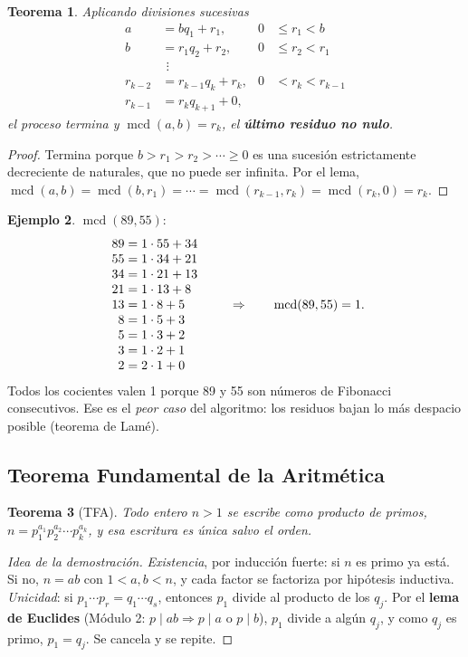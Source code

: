 \documentclass[11pt,a4paper]{article}
\newtheorem{teorema}{Teorema}[section]
\theoremstyle{definition}
\newtheorem{ejemplo}[teorema]{Ejemplo}
\newcommand{\mcd}{\operatorname{mcd}}
\theoremstyle{notait}
\theoremstyle{nota}
\begin{document}
\begin{teorema}
Aplicando divisiones sucesivas
\[
\begin{aligned}
a&=bq_1+r_1, & 0&\le r_1<b\\
b&=r_1q_2+r_2, & 0&\le r_2<r_1\\
&\ \,\vdots\\
r_{k-2}&=r_{k-1}q_k+r_k, & 0&<r_k<r_{k-1}\\
r_{k-1}&=r_kq_{k+1}+0,
\end{aligned}
\]
el proceso termina y $\mcd(a,b)=r_k$, el \textbf{último residuo no nulo}.
\end{teorema}

\begin{proof}
Termina porque $b>r_1>r_2>\cdots\ge 0$ es una sucesión estrictamente decreciente de naturales, que no puede ser infinita. Por el lema, $\mcd(a,b)=\mcd(b,r_1)=\cdots=\mcd(r_{k-1},r_k)=\mcd(r_k,0)=r_k$.
\end{proof}

\begin{ejemplo}
$\mcd(89,55)$:
\[
\begin{array}{r@{\;=\;}l}
89 & 1\cdot 55+34\\
55 & 1\cdot 34+21\\
34 & 1\cdot 21+13\\
21 & 1\cdot 13+8\\
13 & 1\cdot 8+5\\
8 & 1\cdot 5+3\\
5 & 1\cdot 3+2\\
3 & 1\cdot 2+1\\
2 & 2\cdot 1+0
\end{array}
\qquad\Rightarrow\qquad \mcd(89,55)=1.
\]
Todos los cocientes valen 1 porque 89 y 55 son números de Fibonacci consecutivos. Ese es el \emph{peor caso} del algoritmo: los residuos bajan lo más despacio posible (teorema de Lamé).
\end{ejemplo}

\subsection{Teorema Fundamental de la Aritmética}

\begin{teorema}[TFA]
Todo entero $n>1$ se escribe como producto de primos, $n=p_1^{a_1}p_2^{a_2}\cdots p_k^{a_k}$, y esa escritura es única salvo el orden.
\end{teorema}

\begin{proof}[Idea de la demostración]
\emph{Existencia}, por inducción fuerte: si $n$ es primo ya está. Si no, $n=ab$ con $1<a,b<n$, y cada factor se factoriza por hipótesis inductiva. \emph{Unicidad}: si $p_1\cdots p_r=q_1\cdots q_s$, entonces $p_1$ divide al producto de los $q_j$. Por el \textbf{lema de Euclides} (Módulo 2: $p\mid ab\Rightarrow p\mid a$ o $p\mid b$), $p_1$ divide a algún $q_j$, y como $q_j$ es primo, $p_1=q_j$. Se cancela y se repite.
\end{proof}
\end{document}
